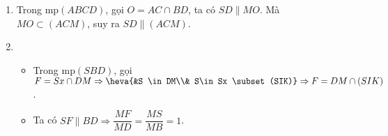 \begin{vd}
{\begin{enumerate}
\begin{itemize}
				Suy ra $SE=(SIK) \cap (SAC).$\\
				\item Ta có $\heva{&S \in (SIK) \cap (SBD)\\ &BD \in (SBD), IK \in (SIK), BD \parallel IK}\Rightarrow (SIK) \cap (SBD)=Sx$, (với $Sx \parallel BD \parallel IK).$
			\end{itemize}
			\item Trong mp$(ABCD)$, gọi $O=AC \cap BD$, ta có $SD \parallel MO$. Mà $MO \subset (ACM)$, suy ra $SD \parallel (ACM)$.
			\item \begin{itemize}
				\item Trong mp$(SBD)$, gọi $F=Sx \cap DM \Rightarrow \heva{&S \in DM\\& S\in Sx \subset (SIK)} \Rightarrow F= DM \cap (SIK)$.
				\item Ta có $SF \parallel BD \Rightarrow \dfrac{MF}{MD}=\dfrac{MS}{MB}=1$.
			\end{itemize}
		\end{enumerate}
	}
\end{vd}


